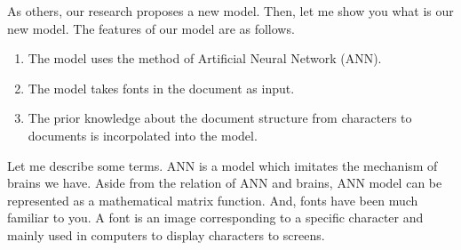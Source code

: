 \documentclass{notes}
\begin{document}
As others, our research proposes a new model.
Then, let me show you what is our new model.
The features of our model are as follows.
\begin{enumerate}
  \item The model uses the method of Artificial Neural Network (ANN).
  \item The model takes fonts in the document as input.
  \item The prior knowledge about the document structure
        from characters to documents is incorpolated into the model.
\end{enumerate}
Let me describe some terms.
ANN is a model which imitates the mechanism of brains we have.
Aside from the relation of ANN and brains, ANN model can be represented
as a mathematical matrix function.
And, fonts have been much familiar to you.
A font is an image corresponding to a specific character
and mainly used in computers to display characters to screens.
\end{document}
